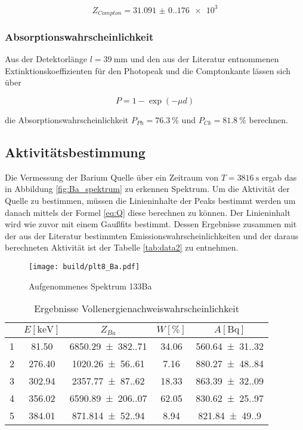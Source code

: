\begin{equation*}
	Z_{Compton}=\num{31.091(0.176)e3}
\end{equation*}

\subsubsection{Absorptionswahrscheinlichkeit}
Aus der Detektorlänge $l=\qty{39}{\milli\meter}$ und den aus der Literatur \cite{web:nist} entnommenen Extinktionskoeffizienten für den Photopeak und die Comptonkante lässen sich über 

\begin{equation}
	P=1-\exp(-\mu d)
\end{equation}

die Absorptionswahrscheinlichkeit $P_{Ph}=\qty{76.3}{\%}$ und $P_{Ck}=\qty{81.8}{\%}$ berechnen.

\subsection{Aktivitätsbestimmung}
Die Vermessung der Barium Quelle über ein Zeitraum von $T=\qty{3816}{\second}$ ergab das in Abbildung \eqref{fig:Ba_spektrum} zu erkennen Spektrum. 
Um die Aktivität der Quelle zu bestimmen, müssen die Linieninhalte der Peaks bestimmt werden um danach mittels der Formel \eqref{eq:Q} diese berechnen zu können. 
Der Linieninhalt wird wie zuvor mit einem Gaußfits bestimmt. 
Dessen Ergebnisse zusammen mit der aus der Literatur \cite{web:nuclear} bestimmten Emissionswahrscheinlichkeiten und 
der daraus berechneten Aktivität ist der Tabelle \eqref{tab:data2} zu entnehmen. 

\begin{figure}[H]
	\centering
	\texttt{[image: build/plt8\_Ba.pdf]}
	\caption{Aufgenommenes Spektrum 133Ba}
	\label{fig:Ba_spektrum}
\end{figure}

\begin{table}[H]
	\centering
	\caption{Ergebnisse Vollenergienachweiswahrscheinlichkeit}
	\begin{tabular}{c c c c c}
		\toprule
		\text{Peak} & $ E [\unit{\kilo\eV}] $ & $ Z_{Ba} $    & $ W [\%] $ & $ A [\unit{\becquerel}] $         \\
		\midrule
		1           & \num{81.50}   &  \num{6850.29(382.71)}  & \num{34.06} & \num{560.64(31.32)} \\
		2           & \num{276.40}  &  \num{1020.26(56.61)}   & \num{7.16}  & \num{880.27(48.84)} \\
		3           & \num{302.94}  &  \num{2357.77(87.62)}   & \num{18.33} & \num{863.39(32.09)} \\
		4           & \num{356.02}  &  \num{6590.89(206.07)}  & \num{62.05} & \num{830.62(25.97)} \\
		5           & \num{384.01}  &  \num{871.814(52.94)}   & \num{8.94}  & \num{821.84(49.90)} \\
		\bottomrule
	\end{tabular}
	\label{tab:data2}
\end{table}

